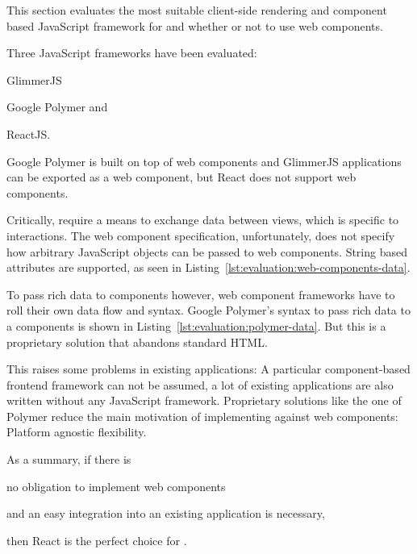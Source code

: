 This section evaluates the most suitable client-side rendering and component based JavaScript framework for \cmvs{} and whether or not to use web components.

Three JavaScript frameworks have been evaluated:
\begin{enumerate*}[label=(\arabic*)]
  \item GlimmerJS
  \item Google Polymer and
  \item ReactJS.
\end{enumerate*}
Google Polymer is built on top of web components and GlimmerJS applications can be exported as a web component, but React does not support web components.

Critically, \cmvs{} require a means to exchange data between views, which is specific to interactions.
The web component specification, unfortunately, does not specify how arbitrary JavaScript objects can be passed to web components.
String based attributes are supported, as seen in Listing~\ref{lst:evaluation:web-components-data}.

To pass rich data to components however, web component frameworks have to roll their own data flow and syntax.
Google Polymer's syntax to pass rich data to a components is shown in Listing~\ref{lst:evaluation:polymer-data}.
But this is a proprietary solution that abandons standard HTML.






This raises some problems in existing applications:
A particular component-based frontend framework can not be assumed, a lot of existing applications are also written without any JavaScript framework.
Proprietary solutions like the one of Polymer reduce the main motivation of implementing against web components:
Platform agnostic flexibility.

As a summary, if there is
\begin{enumerate*}[label=(\arabic*)]
  \item no obligation to implement web components
  \item and an easy integration into an existing application is necessary,
\end{enumerate*}
then React is the perfect choice for \cmvs{}.

